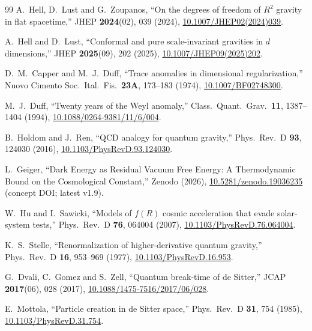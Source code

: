 \documentclass[aps,prd,twocolumn,superscriptaddress,nofootinbib]{revtex4-2}
\begin{document}
\begin{thebibliography}{99}
A.~Hell, D.~Lust and G.~Zoupanos,
``On the degrees of freedom of $R^2$ gravity in flat spacetime,''
JHEP \textbf{2024}(02), 039 (2024),
\href{https://doi.org/10.1007/JHEP02(2024)039}{10.1007/JHEP02(2024)039}.

A.~Hell and D.~Lust,
``Conformal and pure scale-invariant gravities in $d$ dimensions,''
JHEP \textbf{2025}(09), 202 (2025),
\href{https://doi.org/10.1007/JHEP09(2025)202}{10.1007/JHEP09(2025)202}.

D.~M.~Capper and M.~J.~Duff,
``Trace anomalies in dimensional regularization,''
Nuovo Cimento Soc.\ Ital.\ Fis.\ \textbf{23A}, 173--183 (1974),
\href{https://doi.org/10.1007/BF02748300}{10.1007/BF02748300}.

M.~J.~Duff,
``Twenty years of the Weyl anomaly,''
Class.\ Quant.\ Grav.\ \textbf{11}, 1387--1404 (1994),
\href{https://doi.org/10.1088/0264-9381/11/6/004}{10.1088/0264-9381/11/6/004}.

B.~Holdom and J.~Ren,
``QCD analogy for quantum gravity,''
Phys.\ Rev.\ D \textbf{93}, 124030 (2016),
\href{https://doi.org/10.1103/PhysRevD.93.124030}{10.1103/PhysRevD.93.124030}.

L.~Geiger,
``Dark Energy as Residual Vacuum Free Energy: A Thermodynamic Bound on the Cosmological Constant,''
Zenodo (2026), \href{https://doi.org/10.5281/zenodo.19036235}{10.5281/zenodo.19036235} (concept DOI; latest v1.9).

W.~Hu and I.~Sawicki,
``Models of $f(R)$ cosmic acceleration that evade solar-system tests,''
Phys.\ Rev.\ D \textbf{76}, 064004 (2007),
\href{https://doi.org/10.1103/PhysRevD.76.064004}{10.1103/PhysRevD.76.064004}.

K.~S.~Stelle,
``Renormalization of higher-derivative quantum gravity,''
Phys.\ Rev.\ D \textbf{16}, 953--969 (1977),
\href{https://doi.org/10.1103/PhysRevD.16.953}{10.1103/PhysRevD.16.953}.

G.~Dvali, C.~Gomez and S.~Zell,
``Quantum break-time of de Sitter,''
JCAP \textbf{2017}(06), 028 (2017),
\href{https://doi.org/10.1088/1475-7516/2017/06/028}{10.1088/1475-7516/2017/06/028}.

E.~Mottola,
``Particle creation in de Sitter space,''
Phys.\ Rev.\ D \textbf{31}, 754 (1985),
\href{https://doi.org/10.1103/PhysRevD.31.754}{10.1103/PhysRevD.31.754}.


\end{thebibliography}
\end{document}
